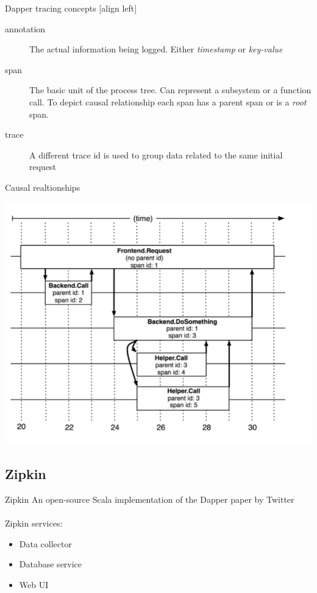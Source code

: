 \begin{frame}{Dapper tracing concepts}
[align left]
\begin{description}
\item[annotation]
The actual information being logged. Either \emph{timestamp} or \emph{key-value}
\item[span]
The basic unit of the process tree. Can represent a subsystem or a function
call. To depict causal relationship each span has a parent span or is a
\emph{root} span.
\item[trace]
A different trace id is used to group data related to the same initial request
\end{description}
\end{frame}

\begin{frame}{Causal realtionships}
\begin{center}
    \includegraphics[scale=0.3]{images/dapper.png} \\
\end{center}
\end{frame}
\subsection{Zipkin}

\begin{frame}{Zipkin}
An open-source Scala implementation of the Dapper paper by Twitter
\hfill \\
\hfill \\
Zipkin services:
\begin{itemize}
\item Data collector
\item Database service
\item Web UI
\end{itemize}
\end{frame}

